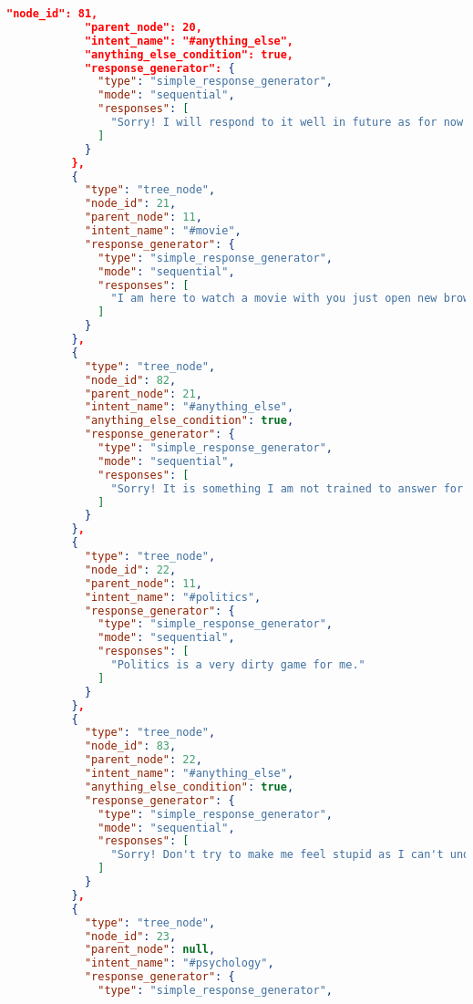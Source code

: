 \begin{appendix}
\begin{lstlisting}[language=json, firstnumber=1]
            "node_id": 81,
            "parent_node": 20,
            "intent_name": "#anything_else",
            "anything_else_condition": true,
            "response_generator": {
              "type": "simple_response_generator",
              "mode": "sequential",
              "responses": [
                "Sorry! I will respond to it well in future as for now I am just fed with limited training data."
              ]
            }
          },
          {
            "type": "tree_node",
            "node_id": 21,
            "parent_node": 11,
            "intent_name": "#movie",
            "response_generator": {
              "type": "simple_response_generator",
              "mode": "sequential",
              "responses": [
                "I am here to watch a movie with you just open new browser window and start watching a movie of your choice."
              ]
            }
          },
          {
            "type": "tree_node",
            "node_id": 82,
            "parent_node": 21,
            "intent_name": "#anything_else",
            "anything_else_condition": true,
            "response_generator": {
              "type": "simple_response_generator",
              "mode": "sequential",
              "responses": [
                "Sorry! It is something I am not trained to answer for now but I will be able to respond well on it in future."
              ]
            }
          },
          {
            "type": "tree_node",
            "node_id": 22,
            "parent_node": 11,
            "intent_name": "#politics",
            "response_generator": {
              "type": "simple_response_generator",
              "mode": "sequential",
              "responses": [
                "Politics is a very dirty game for me."
              ]
            }
          },
          {
            "type": "tree_node",
            "node_id": 83,
            "parent_node": 22,
            "intent_name": "#anything_else",
            "anything_else_condition": true,
            "response_generator": {
              "type": "simple_response_generator",
              "mode": "sequential",
              "responses": [
                "Sorry! Don't try to make me feel stupid as I can't understand it. I will be able to reply once my developer will feed me with more training data."
              ]
            }
          },
          {
            "type": "tree_node",
            "node_id": 23,
            "parent_node": null,
            "intent_name": "#psychology",
            "response_generator": {
              "type": "simple_response_generator",

\end{lstlisting}
\end{appendix}
